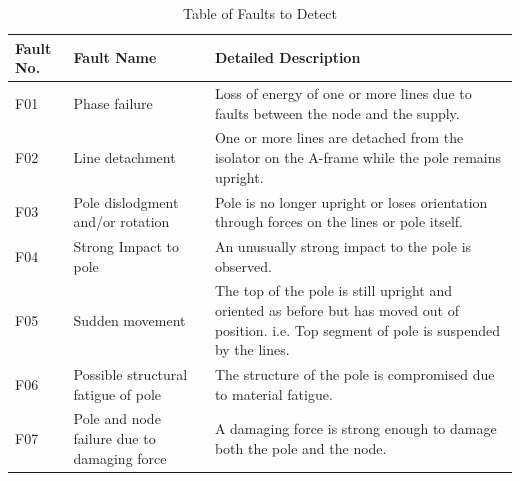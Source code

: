 \documentclass[12pt]{article}
\begin{document}
\begin{center}
  \begin{table}[htp!]
    \caption{Table of Faults to Detect}
    
    \hskip-1.2cm\begin{tabular}{|p{2cm}|p{5cm}|p{11cm}|}
        \hline
        \textbf{Fault No.} & \textbf{Fault Name} & \textbf{Detailed Description} \\
        \hline
        F01 & Phase failure & Loss  of  energy  of  one  or  more  lines  due  to  faults
        between the node and the supply. \\\hline

        F02 & Line detachment & One or more lines are detached from the isolator on the A-frame while the pole remains
        upright. \\\hline

        F03 & Pole dislodgment and/or rotation & Pole is no longer upright or loses orientation through forces on the
        lines or pole itself. \\\hline

        F04 & Strong Impact to pole & An unusually strong impact to the pole is observed. \\\hline

        F05 & Sudden movement & The top of the pole is still upright and oriented as before but has moved out of
        position. i.e. Top segment of pole is suspended by the lines. \\\hline

        F06 & Possible structural fatigue of pole & The structure of the pole is compromised due to material fatigue. \\\hline

        F07 & Pole and node failure due to damaging force & A damaging force is strong enough to damage both the pole
        and the node.  \\\hline
  
    \end{tabular}    
  
  \label{tab:faults}
  \end{table}
\end{center}
\end{document}
